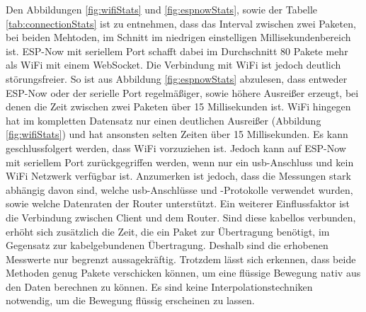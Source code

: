 Den Abbildungen \ref{fig:wifiStats} und \ref{fig:espnowStats}, sowie der Tabelle \ref{tab:connectionStats} ist zu entnehmen, dass das Interval zwischen zwei Paketen, bei beiden Mehtoden, im Schnitt im niedrigen einstelligen Millisekundenbereich ist.
ESP-Now mit seriellem Port schafft dabei im Durchschnitt 80 Pakete mehr als WiFi mit einem WebSocket.
Die Verbindung mit WiFi ist jedoch deutlich störungsfreier.
So ist aus Abbildung \ref{fig:espnowStats} abzulesen, dass entweder ESP-Now oder der serielle Port regelmäßiger, sowie höhere Ausreißer erzeugt, bei denen die Zeit zwischen zwei Paketen über 15 Millisekunden ist.
WiFi hingegen hat im kompletten Datensatz nur einen deutlichen Ausreißer (Abbildung \ref{fig:wifiStats}) und hat ansonsten selten Zeiten über 15 Millisekunden. Es kann geschlussfolgert werden, dass WiFi vorzuziehen ist.
Jedoch kann auf ESP-Now mit seriellem Port zurückgegriffen werden, wenn nur ein \ac{usb}-Anschluss und kein WiFi Netzwerk verfügbar ist.
Anzumerken ist jedoch, dass die Messungen stark abhängig davon sind, welche \ac{usb}-Anschlüsse und -Protokolle verwendet wurden, sowie welche Datenraten der Router unterstützt.
Ein weiterer Einflussfaktor ist die Verbindung zwischen Client und dem Router.
Sind diese kabellos verbunden, erhöht sich zusätzlich die Zeit, die ein Paket zur Übertragung benötigt, im Gegensatz zur kabelgebundenen Übertragung.
Deshalb sind die erhobenen Messwerte nur begrenzt aussagekräftig.
Trotzdem lässt sich erkennen, dass beide Methoden genug Pakete verschicken können, um eine flüssige Bewegung nativ aus den Daten berechnen zu können.
Es sind keine Interpolationstechniken notwendig, um die Bewegung flüssig erscheinen zu lassen.

\newpage

